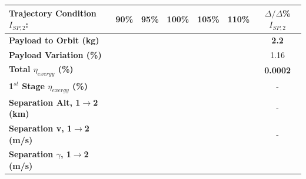\begin{table}[ht!]
	\centering
	\begin{tabular}{l c c c c c c} 
		\hline \textbf{Trajectory Condition}   \qquad  $I_{SP,2}$:
		&90\%
		&95\%
		&100\%
		&105\%
		&110\%
		& $\Delta/\Delta$\%$I_{SP,2}$
		\\
		\hline \textbf{Payload to Orbit (kg)}
		& \textbf{\PayloadToOrbitIspNinetyNoReturn}
		& \textbf{\PayloadToOrbitIspNinetyFiveNoReturn}
		& \textbf{\PayloadToOrbitIspStandardNoReturn}
		& \textbf{\PayloadToOrbitIspOneHundredFiveNoReturn}
		& \textbf{\PayloadToOrbitIspOneHundredTenNoReturn}
		&\textbf{2.2}
		\\
		\textbf{Payload Variation (\%)}
		& \PayloadVarIspNinetyNoReturn
		& \PayloadVarIspNinetyFiveNoReturn
		& \PayloadVarIspStandardNoReturn
		& \PayloadVarIspOneHundredFiveNoReturn
		& \PayloadVarIspOneHundredTenNoReturn
		&1.16
		\\
		\textbf{Total $\eta_{exergy}$ (\%)}
		& \textbf{\totalExergyEffIspNinetyNoReturn}
		& \textbf{\totalExergyEffIspNinetyFiveNoReturn}
		& \textbf{\totalExergyEffIspStandardNoReturn}
		& \textbf{\totalExergyEffIspOneHundredFiveNoReturn}
		& \textbf{\totalExergyEffIspOneHundredTenNoReturn}
		& \textbf{0.0002}
		\\
		\hline 
		\textbf{1$^{st}$ Stage $\eta_{exergy}$ (\%)}
		& \textbf{\firstExergyEffIspNinetyNoReturn}
		& \textbf{\firstExergyEffIspNinetyFiveNoReturn}
		& \textbf{\firstExergyEffIspStandardNoReturn}
		& \textbf{\firstExergyEffIspOneHundredFiveNoReturn}
		& \textbf{\firstExergyEffIspOneHundredTenNoReturn}
		& -
		\\
		\textbf{Separation Alt, 1$\rightarrow$2 (km)}
		& \firstsecondSeparationAltIspNinetyNoReturn
		& \firstsecondSeparationAltIspNinetyFiveNoReturn
		& \firstsecondSeparationAltIspStandardNoReturn
		& \firstsecondSeparationAltIspOneHundredFiveNoReturn
		& \firstsecondSeparationAltIspOneHundredTenNoReturn
		& -
		\\
		\textbf{Separation v, 1$\rightarrow$2 (m/s)}
		& \firstsecondSeparationvIspNinetyNoReturn
		& \firstsecondSeparationvIspNinetyFiveNoReturn
		& \firstsecondSeparationvIspStandardNoReturn
		& \firstsecondSeparationvIspOneHundredFiveNoReturn
		& \firstsecondSeparationvIspOneHundredTenNoReturn
		& -
		\\
		\textbf{Separation $\gamma$, 1$\rightarrow$2 (m/s)}
		& \firstsecondSeparationgammaIspNinetyNoReturn
		& \firstsecondSeparationgammaIspNinetyFiveNoReturn
		& \firstsecondSeparationgammaIspStandardNoReturn
		& \firstsecondSeparationgammaIspOneHundredFiveNoReturn

\end{tabular}
\end{table}
